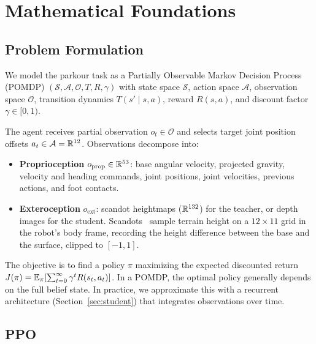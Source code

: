 \section{Mathematical Foundations}
\label{sec:math}

\subsection{Problem Formulation}

We model the parkour task as a Partially Observable Markov Decision
Process (POMDP) $(\mathcal{S}, \mathcal{A}, \mathcal{O}, T, R, \gamma)$
with state space $\mathcal{S}$, action space $\mathcal{A}$,
observation space $\mathcal{O}$, transition dynamics
$T(s'\mid s,a)$, reward $R(s,a)$, and discount factor $\gamma \in [0,1)$.

The agent receives partial observation $o_t \in \mathcal{O}$
and selects target joint position offsets
$a_t \in \mathcal{A} = \mathbb{R}^{12}$.
Observations decompose into:
\begin{itemize}
	\item \textbf{Proprioception} $o_\text{prop} \in \mathbb{R}^{53}$: base
	      angular velocity, projected gravity, velocity and heading
	      commands, joint positions, joint velocities, previous
	      actions, and foot contacts.
	\item \textbf{Exteroception} $o_\text{ext}$: scandot
	      heightmaps ($\mathbb{R}^{132}$) for the teacher, or depth images
	      for the student.  Scandots~\citep{agarwal2023legged} sample terrain
	      height on a $12 \times 11$ grid in the robot's body frame,
	      recording the height difference between the base and the
	      surface, clipped to $[-1, 1]$.
\end{itemize}

The objective is to find a policy $\pi$ maximizing the expected
discounted return
$J(\pi) = \mathbb{E}_\pi\!\left[\sum_{t=0}^{\infty} \gamma^t R(s_t, a_t)\right]$.
In a POMDP, the optimal policy generally depends on the full belief
state.  In practice, we approximate this with a recurrent architecture
(Section~\ref{sec:student}) that integrates observations over time.

\subsection{PPO}
\label{sec:ppo}

